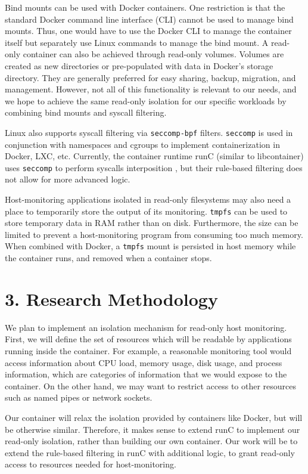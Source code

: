 \documentclass{proc}
\begin{document}
Bind mounts can be used with Docker containers. One restriction is that the standard Docker command line interface (CLI) cannot be used to manage bind mounts. Thus, one would have to use the Docker CLI to manage the container itself but separately use Linux commands to manage the bind mount. A read-only container can also be achieved through read-only volumes. Volumes are created as new directories or pre-populated with data in Docker's storage directory. They are generally preferred for easy sharing, backup, migration, and management. However, not all of this functionality is relevant to our needs, and we hope to achieve the same read-only isolation for our specific workloads by combining bind mounts and syscall filtering.

Linux also supports syscall filtering via \texttt{seccomp-bpf} filters. \texttt{seccomp} is used in conjunction with namespaces and cgroups to implement containerization in Docker, LXC, etc. Currently, the container runtime runC (similar to libcontainer) uses \texttt{seccomp} to perform syscalls interposition \cite{opencontainerinitiative}, but their rule-based filtering does not allow for more advanced logic.

Host-monitoring applications isolated in read-only filesystems may also need a place to temporarily store the output of its monitoring. \texttt{tmpfs} can be used to store temporary data in RAM rather than on disk. Furthermore, the size can be limited to prevent a host-monitoring program from consuming too much memory. When combined with Docker, a \texttt{tmpfs} mount is persisted in host memory while the container runs, and removed when a container stops.

\section*{3. Research Methodology}

We plan to implement an isolation mechanism for read-only host monitoring. First, we will define the set of resources which will be readable by applications running inside the container. For example, a reasonable monitoring tool would access information about CPU load, memory usage, disk usage, and process information, which are categories of information that we would expose to the container. On the other hand, we may want to restrict access to other resources such as named pipes or network sockets.

Our container will relax the isolation provided by containers like Docker, but will be otherwise similar. Therefore, it makes sense to extend runC to implement our read-only isolation, rather than building our own container. Our work will be to extend the rule-based filtering in runC with additional logic, to grant read-only access to resources needed for host-monitoring.
\end{document}
